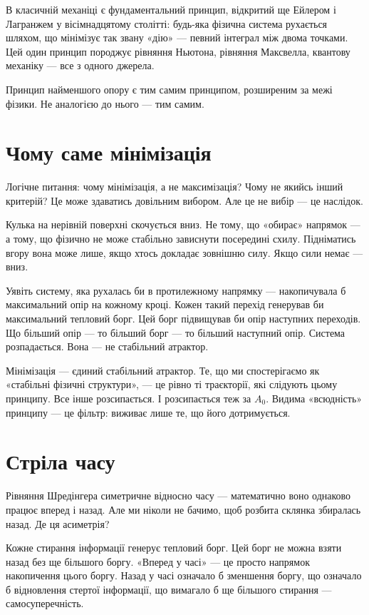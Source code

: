 \documentclass[12pt, a4paper, openany]{book}
\begin{document}
В класичній механіці є фундаментальний принцип, відкритий ще Ейлером і Лагранжем у вісімнадцятому столітті: будь-яка фізична система рухається шляхом, що мінімізує так звану «дію» --- певний інтеграл між двома точками. Цей один принцип породжує рівняння Ньютона, рівняння Максвелла, квантову механіку --- все з одного джерела.

Принцип найменшого опору є тим самим принципом, розширеним за межі фізики. Не аналогією до нього --- тим самим.

\section{Чому саме мінімізація}

Логічне питання: чому мінімізація, а не максимізація? Чому не якийсь інший критерій? Це може здаватись довільним вибором. Але це не вибір --- це наслідок.

\begin{analogybox}
Кулька на нерівній поверхні скочується вниз. Не тому, що «обирає» напрямок --- а тому, що фізично не може стабільно зависнути посередині схилу. Підніматись вгору вона може лише, якщо хтось докладає зовнішню силу. Якщо сили немає --- вниз.
\end{analogybox}

Уявіть систему, яка рухалась би в протилежному напрямку --- накопичувала б максимальний опір на кожному кроці. Кожен такий перехід генерував би максимальний тепловий борг. Цей борг підвищував би опір наступних переходів. Що більший опір --- то більший борг --- то більший наступний опір. Система розпадається. Вона — не стабільний атрактор.

Мінімізація --- єдиний стабільний атрактор. Те, що ми спостерігаємо як «стабільні фізичні структури», --- це рівно ті траєкторії, які слідують цьому принципу. Все інше розсипається. І розсипається теж за $A_0$. Видима «всюдність» принципу --- це фільтр: виживає лише те, що його дотримується.

\section{Стріла часу}

Рівняння Шредінгера симетричне відносно часу --- математично воно однаково працює вперед і назад. Але ми ніколи не бачимо, щоб розбита склянка збиралась назад. Де ця асиметрія?

Кожне стирання інформації генерує тепловий борг. Цей борг не можна взяти назад без ще більшого боргу. «Вперед у часі» --- це просто напрямок накопичення цього боргу. Назад у часі означало б зменшення боргу, що означало б відновлення стертої інформації, що вимагало б ще більшого стирання --- самосуперечність.
\end{document}
